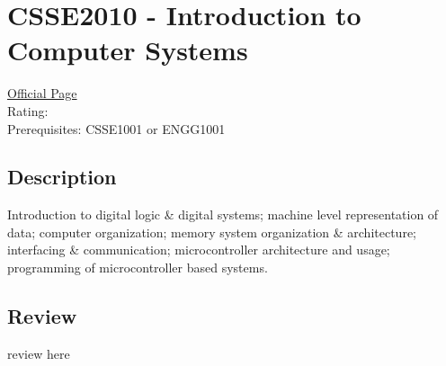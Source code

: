 \hypertarget{CSSE2010}{\section{CSSE2010 - Introduction to Computer Systems}}

\large
\textcolor{turbo_purple}{\href{https://my.uq.edu.au/programs-courses/course.html?course_code=CSSE2010}{Official Page}} \\
Rating: \cstar\cstar\cstar\cstar\ostar \\
Prerequisites: CSSE1001 or ENGG1001

\normalsize
\subsection*{Description}
Introduction to digital logic \& digital systems; machine level representation of data; computer organization; memory system organization \& architecture; interfacing \& communication; microcontroller architecture and usage; programming of microcontroller based systems.

\subsection*{Review}
review here
